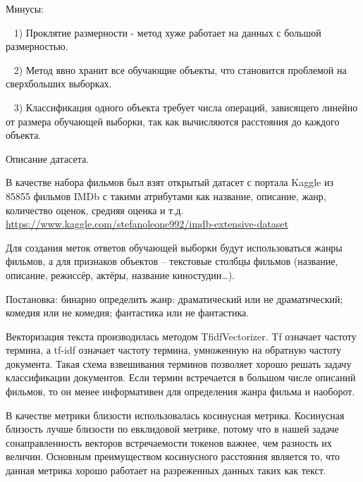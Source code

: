 \documentclass[a4paper,titlepage]{article}
\begin{document}
Минусы:

\par ~ 1) Проклятие размерности - метод хуже работает на данных с большой размерностью.

\par ~ 2) Метод явно хранит все обучающие объекты, что становится проблемой на сверхбольших выборках.

\par ~ 3) Классификация одного объекта требует числа операций, зависящего линейно от размера обучающей выборки, так как вычисляются расстояния до каждого объекта.




Описание датасета.

В качестве набора фильмов был взят открытый датасет с портала Kaggle из 85855 фильмов IMDb с такими атрибутами как название, описание, жанр, количество оценок, средняя оценка и т.д. 
\url{https://www.kaggle.com/stefanoleone992/imdb-extensive-dataset}

Для создания меток ответов обучающей выборки будут использоваться жанры фильмов, а для признаков объектов – текстовые столбцы фильмов (название, описание, режиссёр, актёры, название киностудии…).

Постановка: бинарно определить жанр: драматический или  не драматический; комедия или не комедия; фантастика или не фантастика.

Векторизация текста производилась методом TfidfVectorizer. Tf означает частоту термина, а tf-idf означает частоту термина, умноженную на обратную частоту документа. Такая схема взвешивания терминов позволяет хорошо решать задачу классификации документов. Если термин встречается в большом числе описаний фильмов, то он менее информативен для определения жанра фильма и наоборот. 

В качестве метрики близости использовалась косинусная метрика. Косинусная близость лучше близости по евклидовой метрике, потому что в нашей задаче сонаправленность векторов встречаемости токенов важнее, чем разность их величин. Основным преимуществом косинусного расстояния является то, что данная метрика хорошо работает на разреженных данных таких как текст.
\newpage
\end{document}
